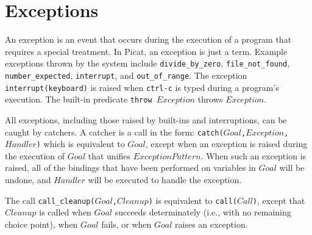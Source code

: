 \section{Exceptions}
An exception is an event that occurs during the execution of a program that requires a special treatment. In Picat, an exception is just a term. Example exceptions thrown by the system include \texttt{divide\_by\_zero}, \texttt{file\_not\_found}, \texttt{number\_expected}, \texttt{interrupt}, and \texttt{out\_of\_range}. The exception \texttt{interrupt(keyboard)} is raised when \texttt{ctrl-c} is typed during a program's execution. The built-in predicate \texttt{throw $Exception$} throws $Exception$. 

All exceptions, including those raised by built-ins and interruptions, can be caught by catchers. A catcher is a call in the form: {\tt catch($Goal$,$Exception$,$Handler$)} which is equivalent to $Goal$, except when an exception is raised during the execution of $Goal$ that unifies $ExceptionPattern$. When such an exception is raised, all of the bindings that have been performed on variables in $Goal$ will be undone, and $Handler$ will be executed to handle the exception. 

The call \texttt{call\_cleanup($Goal$,$Cleanup$)} is equivalent to {\tt call($Call$)}, except that \texttt{$Cleanup$} is called when \texttt{$Goal$} succeeds determinately (i.e., with no remaining choice point), when \texttt{$Goal$} fails, or when \texttt{$Goal$} raises an exception.


